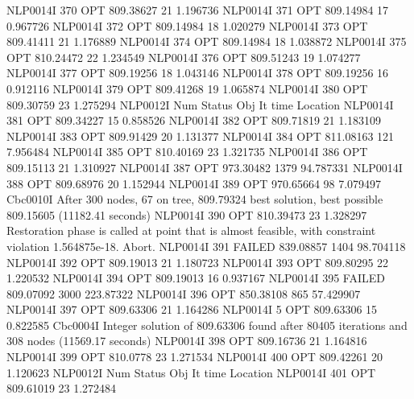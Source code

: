 NLP0014I           370         OPT 809.38627       21 1.196736
NLP0014I           371         OPT 809.14984       17 0.967726
NLP0014I           372         OPT 809.14984       18 1.020279
NLP0014I           373         OPT 809.41411       21 1.176889
NLP0014I           374         OPT 809.14984       18 1.038872
NLP0014I           375         OPT 810.24472       22 1.234549
NLP0014I           376         OPT 809.51243       19 1.074277
NLP0014I           377         OPT 809.19256       18 1.043146
NLP0014I           378         OPT 809.19256       16 0.912116
NLP0014I           379         OPT 809.41268       19 1.065874
NLP0014I           380         OPT 809.30759       23 1.275294
NLP0012I 
              Num      Status      Obj             It       time                 Location
NLP0014I           381         OPT 809.34227       15 0.858526
NLP0014I           382         OPT 809.71819       21 1.183109
NLP0014I           383         OPT 809.91429       20 1.131377
NLP0014I           384         OPT 811.08163      121 7.956484
NLP0014I           385         OPT 810.40169       23 1.321735
NLP0014I           386         OPT 809.15113       21 1.310927
NLP0014I           387         OPT 973.30482     1379 94.787331
NLP0014I           388         OPT 809.68976       20 1.152944
NLP0014I           389         OPT 970.65664       98 7.079497
Cbc0010I After 300 nodes, 67 on tree, 809.79324 best solution, best possible 809.15605 (11182.41 seconds)
NLP0014I           390         OPT 810.39473       23 1.328297
Restoration phase is called at point that is almost feasible,
  with constraint violation 1.564875e-18. Abort.
NLP0014I           391      FAILED 839.08857     1404 98.704118
NLP0014I           392         OPT 809.19013       21 1.180723
NLP0014I           393         OPT 809.80295       22 1.220532
NLP0014I           394         OPT 809.19013       16 0.937167
NLP0014I           395      FAILED 809.07092     3000 223.87322
NLP0014I           396         OPT 850.38108      865 57.429907
NLP0014I           397         OPT 809.63306       21 1.164286
NLP0014I             5         OPT 809.63306       15 0.822585
Cbc0004I Integer solution of 809.63306 found after 80405 iterations and 308 nodes (11569.17 seconds)
NLP0014I           398         OPT 809.16736       21 1.164816
NLP0014I           399         OPT 810.0778       23 1.271534
NLP0014I           400         OPT 809.42261       20 1.120623
NLP0012I 
              Num      Status      Obj             It       time                 Location
NLP0014I           401         OPT 809.61019       23 1.272484
